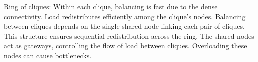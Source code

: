 Ring of cliques: Within each clique, balancing is fast due to the dense connectivity. Load redistributes efficiently among the clique's nodes. Balancing between cliques depends on the single shared node linking each pair of cliques. This structure ensures sequential redistribution across the ring. The shared nodes act as gateways, controlling the flow of load between cliques. Overloading these nodes can cause bottlenecks.